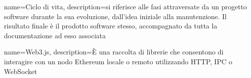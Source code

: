 {
	name={Ciclo di vita},
	description={si riferisce alle fasi attraversate da un progetto software durante la sua evoluzione, dall'idea iniziale alla manutenzione. Il risultato finale è il prodotto software stesso, accompagnato da tutta la documentazione ad esso associata}
}

{
	name={Web3.js},
	description={È una raccolta di librerie che consentono di interagire con un nodo Ethereum\glo{} locale o remoto utilizzando HTTP, IPC o WebSocket}
}

